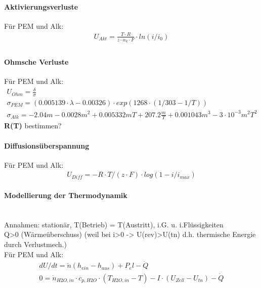 \paragraph{Aktivierungsverluste}
Für PEM und Alk:
\begin{align}
	U_{Akt} = \frac{T \cdot R}{z \cdot \alpha_k
		\cdot F} \cdot ln(i/i_0)\\ %
\end{align}

\paragraph{Ohmsche Verluste}
Für PEM und Alk:\\

\begin{align}
	U_{Ohm} = \frac{\delta}{\sigma}\\ %
	\sigma _{PEM} = (0.005139 \cdot \lambda -0.00326) \cdot exp(1268 \cdot (1/303-1/T))\\
	\sigma _{Alk} = -2.04m -0.0028m^2  + 0.005332mT +207.2 \frac{m}{T} +0.001043m^3-3 \cdot 10^{-3}m^2T^2
\end{align}
\textbf{R(T)} bestimmen?\\

\paragraph{Diffusionsüberspannung}
Für PEM und Alk:
\begin{align}
	U_{Diff} = - R \cdot T/(z \cdot F) \cdot log(1 - i/i_{max})
\end{align}

\paragraph{Modellierung der Thermodynamik}\ \\
Annahmen: stationär, T(Betrieb) = T(Austritt), i.G. u. i.Flüssigkeiten\\
Q>0 (Wärmeüberschuss) (weil bei i>0 -> U(rev)>U(tn) d.h. thermische Energie durch Verlustmech.)\\ 

Für PEM und Alk:\\
\begin{align}
	dU/dt = \dot{n} (h_{ein} - h_{aus}) + P_el - \dot{Q}\\
	0 = \dot{n}_{H2O, in} \cdot c_{p, H2O} \cdot (T_{H2O, in} - T) - I \cdot (U_{Zell} - U_{tn}) - \dot{Q}
\end{align}

